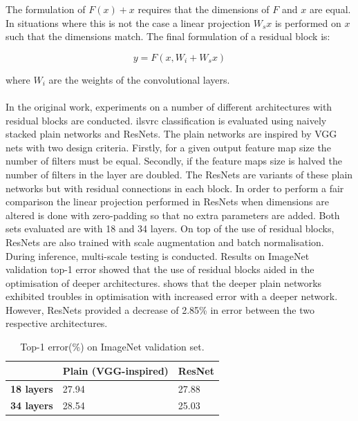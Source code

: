 The formulation of $F(x) + x$ requires that the dimensions of $F$ and $x$ are equal. In situations where this is not the case a linear projection $W_sx$ is performed on $x$ such that the dimensions match. The final formulation of a residual block is:

\begin{equation}
	y = F(x, {W_i} + W_sx)
\end{equation}

where $W_i$ are the weights of the convolutional layers.
\\\\
In the original work, experiments on a number of different architectures with residual blocks are conducted. \gls{ilsvrc} classification is evaluated using naively stacked plain networks and ResNets. The plain networks are inspired by VGG nets \cite{vgg16} with two design criteria. Firstly, for a given output feature map size the number of filters must be equal. Secondly, if the feature maps size is halved the number of filters in the layer are doubled. The ResNets are variants of these plain networks but with residual connections in each block. In order to perform a fair comparison the linear projection performed in ResNets when dimensions are altered is done with zero-padding so that no extra parameters are added. Both sets evaluated are with 18 and 34 layers. On top of the use of residual blocks, ResNets are also trained with scale augmentation and batch normalisation. During inference, multi-scale testing is conducted. Results on ImageNet validation top-1 error showed that the use of residual blocks aided in the optimisation of deeper architectures.  shows that the deeper plain networks exhibited troubles in optimisation with increased error with a deeper network. However, ResNets provided a decrease of 2.85\% in error between the two respective architectures.

\begin{table}[h]
\centering
\caption{Top-1 error(\%) on ImageNet validation set.}
\label{tab:plainrestable}
\begin{tabular}{|l|l|l|}
\hline
          & \textbf{Plain (VGG-inspired)} & \textbf{ResNet} \\ \hline
\textbf{18 layers} & 27.94 & 27.88  \\ \hline
\textbf{34 layers} & 28.54 & 25.03  \\ \hline
\end{tabular}
\end{table}

